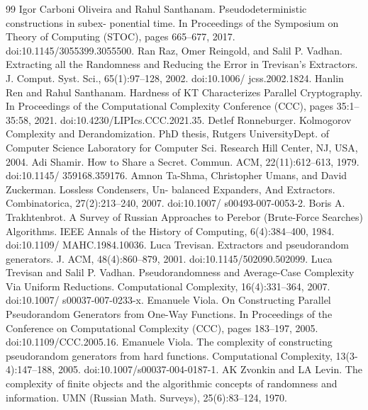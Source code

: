 \begin{thebibliography}{99}
 Igor Carboni Oliveira and Rahul Santhanam. Pseudodeterministic constructions in subex- ponential time. In Proceedings of the Symposium on Theory of Computing (STOC), pages 665–677, 2017. doi:10.1145/3055399.3055500.
 Ran Raz, Omer Reingold, and Salil P. Vadhan. Extracting all the Randomness and Reducing the Error in Trevisan’s Extractors. J. Comput. Syst. Sci., 65(1):97–128, 2002. doi:10.1006/ jcss.2002.1824.
 Hanlin Ren and Rahul Santhanam. Hardness of KT Characterizes Parallel Cryptography. In Proceedings of the Computational Complexity Conference (CCC), pages 35:1–35:58, 2021. doi:10.4230/LIPIcs.CCC.2021.35.
 Detlef Ronneburger. Kolmogorov Complexity and Derandomization. PhD thesis, Rutgers UniversityDept. of Computer Science Laboratory for Computer Sci. Research Hill Center, NJ, USA, 2004.
 Adi Shamir. How to Share a Secret. Commun. ACM, 22(11):612–613, 1979. doi:10.1145/ 359168.359176.
 Amnon Ta-Shma, Christopher Umans, and David Zuckerman. Lossless Condensers, Un- balanced Expanders, And Extractors. Combinatorica, 27(2):213–240, 2007. doi:10.1007/ s00493-007-0053-2.
 Boris A. Trakhtenbrot. A Survey of Russian Approaches to Perebor (Brute-Force Searches) Algorithms. IEEE Annals of the History of Computing, 6(4):384–400, 1984. doi:10.1109/ MAHC.1984.10036.
 Luca Trevisan. Extractors and pseudorandom generators. J. ACM, 48(4):860–879, 2001. doi:10.1145/502090.502099.
 Luca Trevisan and Salil P. Vadhan. Pseudorandomness and Average-Case Complexity Via Uniform Reductions. Computational Complexity, 16(4):331–364, 2007. doi:10.1007/ s00037-007-0233-x.
 Emanuele Viola. On Constructing Parallel Pseudorandom Generators from One-Way Functions. In Proceedings of the Conference on Computational Complexity (CCC), pages 183–197, 2005. doi:10.1109/CCC.2005.16.
 Emanuele Viola. The complexity of constructing pseudorandom generators from hard functions. Computational Complexity, 13(3-4):147–188, 2005. doi:10.1007/s00037-004-0187-1.
 AK Zvonkin and LA Levin. The complexity of finite objects and the algorithmic concepts of randomness and information. UMN (Russian Math. Surveys), 25(6):83–124, 1970.
\end{thebibliography}
